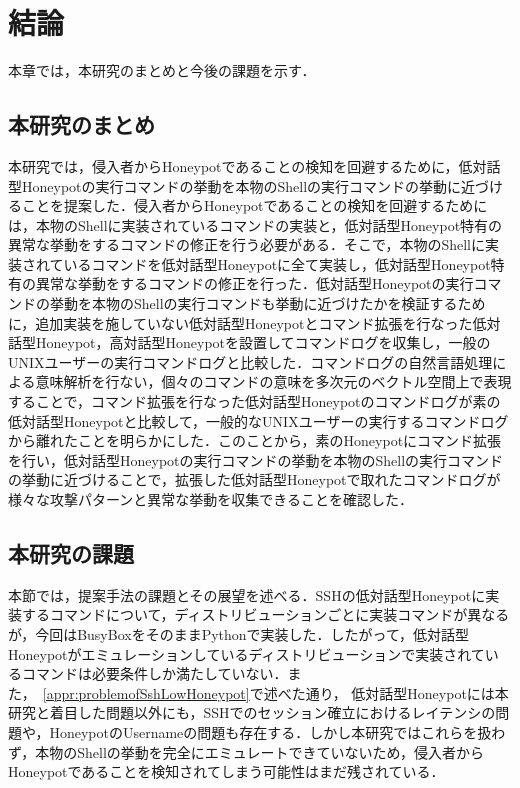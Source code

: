 \chapter{結論}
\label{conc}

本章では，本研究のまとめと今後の課題を示す．

\section{本研究のまとめ}

本研究では，侵入者からHoneypotであることの検知を回避するために，低対話型Honeypotの実行コマンドの挙動を本物のShellの実行コマンドの挙動に近づけることを提案した．侵入者からHoneypotであることの検知を回避するためには，本物のShellに実装されているコマンドの実装と，低対話型Honeypot特有の異常な挙動をするコマンドの修正を行う必要がある．そこで，本物のShellに実装されているコマンドを低対話型Honeypotに全て実装し，低対話型Honeypot特有の異常な挙動をするコマンドの修正を行った．低対話型Honeypotの実行コマンドの挙動を本物のShellの実行コマンドも挙動に近づけたかを検証するために，追加実装を施していない低対話型Honeypotとコマンド拡張を行なった低対話型Honeypot，高対話型Honeypotを設置してコマンドログを収集し，一般のUNIXユーザーの実行コマンドログと比較した．コマンドログの自然言語処理による意味解析を行ない，個々のコマンドの意味を多次元のベクトル空間上で表現することで，コマンド拡張を行なった低対話型Honeypotのコマンドログが素の低対話型Honeypotと比較して，一般的なUNIXユーザーの実行するコマンドログから離れたことを明らかにした．このことから，素のHoneypotにコマンド拡張を行い，低対話型Honeypotの実行コマンドの挙動を本物のShellの実行コマンドの挙動に近づけることで，拡張した低対話型Honeypotで取れたコマンドログが様々な攻撃パターンと異常な挙動を収集できることを確認した．

\section{本研究の課題}
本節では，提案手法の課題とその展望を述べる．SSHの低対話型Honeypotに実装するコマンドについて，ディストリビューションごとに実装コマンドが異なるが，今回はBusyBoxをそのままPythonで実装した．したがって，低対話型Honeypotがエミュレーションしているディストリビューションで実装されているコマンドは必要条件しか満たしていない．また，~\ref{appr:problemofSshLowHoneypot}で述べた通り，
低対話型Honeypotには本研究と着目した問題以外にも，SSHでのセッション確立におけるレイテンシの問題や，HoneypotのUsernameの問題も存在する．しかし本研究ではこれらを扱わず，本物のShellの挙動を完全にエミュレートできていないため，侵入者からHoneypotであることを検知されてしまう可能性はまだ残されている．

